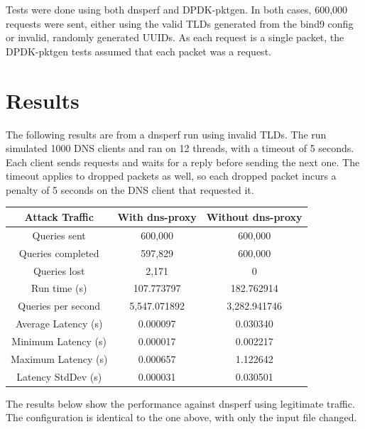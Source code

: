 \documentclass[12pt]{extarticle}
\begin{document}
Tests were done using both dnsperf and DPDK-pktgen. In both cases, 600,000 requests were sent, either using the valid TLDs generated from the bind9 config or invalid, randomly generated UUIDs. As each request is a single packet, the DPDK-pktgen tests assumed that each packet was a request. \\

\section{Results}

The following results are from a dnsperf run using invalid TLDs. The run simulated 1000 DNS clients and ran on 12 threads, with a timeout of 5 seconds. Each client sends requests and waits for a reply before sending the next one. The timeout applies to dropped packets as well, so each dropped packet incurs a penalty of 5 seconds on the DNS client that requested it. \\

\begin{center}
\begin{tabular}{ ||c|c|c|| }
\hline
Attack Traffic & With dns-proxy & Without dns-proxy \\
\hline
Queries sent & 600,000 & 600,000 \\
Queries completed & 597,829 & 600,000 \\
Queries lost & 2,171 & 0 \\
Run time (s) & 107.773797 & 182.762914 \\
Queries per second & 5,547.071892 & 3,282.941746 \\
Average Latency (s) & 0.000097 & 0.030340 \\
Minimum Latency (s) & 0.000017 & 0.002217 \\
Maximum Latency (s) & 0.000657 & 1.122642 \\
Latency StdDev (s) & 0.000031 & 0.030501 \\
\hline
\end{tabular}
\end{center}

The results below show the performance against dnsperf using legitimate traffic. The configuration is identical to the one above, with only the input file changed. \\
\end{document}
